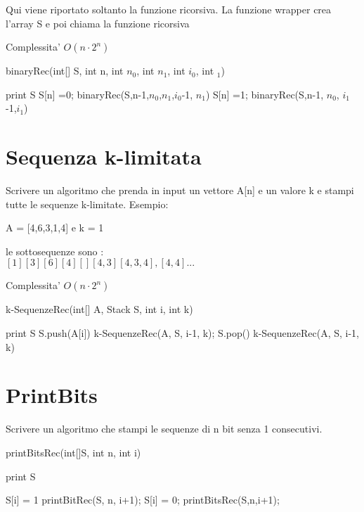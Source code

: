 \documentclass[oneside]{book}
\begin{document}
Qui viene riportato soltanto la funzione ricorsiva. La funzione wrapper crea l'array S e poi chiama la funzione ricorsiva 

Complessita' $O(n\cdot 2^n)$
\begin{algorithm}
\caption{binaryRec(int[] S, int n, int $n_0$, int $n_1$, int $i_0$, int $_1$)}
\begin{algorithmic}
	\State print S
\EndIf
{}
	\State S[n] =0;
	\State binaryRec(S,n-1,$n_0$,$n_1$,$i_0$-1, $n_1$)
\EndIf
{}
	\State S[n] =1;
	\State binaryRec(S,n-1, $n_0$, $i_1$-1,$i_1$)
\EndIf	
\end{algorithmic}
\end{algorithm}
\newpage
\section{Sequenza k-limitata}
Scrivere un algoritmo che prenda in input un vettore A[n] e un valore k e stampi tutte le sequenze k-limitate. Esempio: 

A = [4,6,3,1,4] e k = 1

le sottosequenze sono :\\
$[1][3][6][4][][4,3][4,3,4],[4,4] ...$

Complessita' $O(n\cdot 2^n)$

\begin{algorithm}
\caption{k-SequenzeRec(int[] A, Stack S, int i, int k)\label{alg:cap}}
\begin{algorithmic}

	\State print S
\Else
		\State S.push(A[i])
		\State k-SequenzeRec(A, S, i-1, k);
		\State S.pop()
	\EndIf
	\State k-SequenzeRec(A, S, i-1, k)

\EndIf
\end{algorithmic}
\end{algorithm}


\section{PrintBits}
Scrivere un algoritmo che stampi le sequenze di n bit senza 1 consecutivi.

\begin{algorithm}
\caption{printBitsRec(int[]S, int n, int i)\label{alg:cap}}
\begin{algorithmic}
	\State print S
\EndIf

	\State S[i] = 1
	\State printBitRec(S, n, i+1);
\Else
	\State S[i] = 0;
	\State printBitsRec(S,n,i+1);
\EndIf
\end{algorithmic}
\end{algorithm}
\newpage
\end{document}
